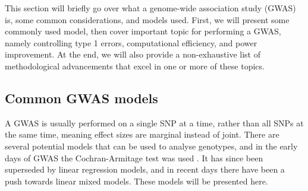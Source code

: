 


This section will briefly go over what a genome-wide association study (GWAS) is, some common considerations, and models used. First, we will present some commonly used model, then cover important topic for performing a GWAS, namely controlling type 1 errors, computational efficiency, and power improvement. At the end, we will also provide a non-exhaustive list of methodological advancements that excel in one or more of these topics. 


\subsection{Common GWAS models} \label{sec:GWAS:LinReg}
A GWAS is usually performed on a single SNP at a time, rather than all SNPs at the same time, meaning effect sizes are marginal instead of joint. There are several potential models that can be used to analyse genotypes, and in the early days of GWAS the Cochran-Armitage test \cite{cochran1954some,armitageTest} was used \cite{balding2006tutorial}. It has since been superseded by linear regression models, and in recent days there have been a push towards linear mixed models. These models will be presented here.


